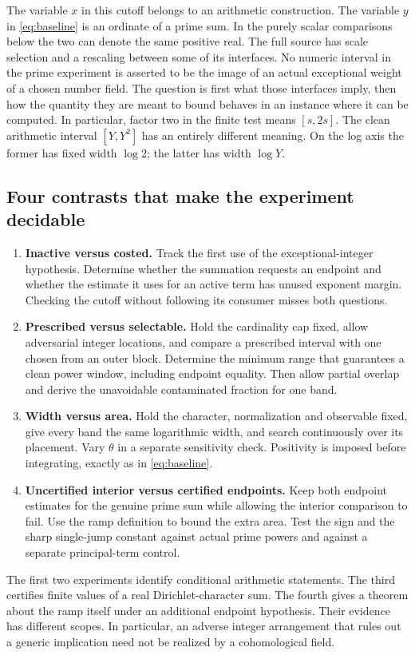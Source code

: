 \documentclass[12pt,letterpaper]{article}
\begin{document}
The variable \(x\) in this cutoff belongs to an arithmetic construction. The variable \(y\) in \eqref{eq:baseline} is an ordinate of a prime sum. In the purely scalar comparisons below the two can denote the same positive real. The full source has scale selection and a rescaling between some of its interfaces. No numeric interval in the prime experiment is asserted to be the image of an actual exceptional weight of a chosen number field. The question is first what those interfaces imply, then how the quantity they are meant to bound behaves in an instance where it can be computed. In particular, factor two in the finite test means \([s,2s]\). The clean arithmetic interval \([Y,Y^2]\) has an entirely different meaning. On the log axis the former has fixed width \(\log 2\); the latter has width \(\log Y\).

\subsection{Four contrasts that make the experiment decidable}
\begin{enumerate}
\item \textbf{Inactive versus costed.} Track the first use of the exceptional-integer hypothesis. Determine whether the summation requests an endpoint and whether the estimate it uses for an active term has unused exponent margin. Checking the cutoff without following its consumer misses both questions.
\item \textbf{Prescribed versus selectable.} Hold the cardinality cap fixed, allow adversarial integer locations, and compare a prescribed interval with one chosen from an outer block. Determine the minimum range that guarantees a clean power window, including endpoint equality. Then allow partial overlap and derive the unavoidable contaminated fraction for one band.
\item \textbf{Width versus area.} Hold the character, normalization and observable fixed, give every band the same logarithmic width, and search continuously over its placement. Vary \(\theta\) in a separate sensitivity check. Positivity is imposed before integrating, exactly as in \eqref{eq:baseline}.
\item \textbf{Uncertified interior versus certified endpoints.} Keep both endpoint estimates for the genuine prime sum while allowing the interior comparison to fail. Use the ramp definition to bound the extra area. Test the sign and the sharp single-jump constant against actual prime powers and against a separate principal-term control.
\end{enumerate}
The first two experiments identify conditional arithmetic statements. The third certifies finite values of a real Dirichlet-character sum. The fourth gives a theorem about the ramp itself under an additional endpoint hypothesis. Their evidence has different scopes. In particular, an adverse integer arrangement that rules out a generic implication need not be realized by a cohomological field.
\end{document}

